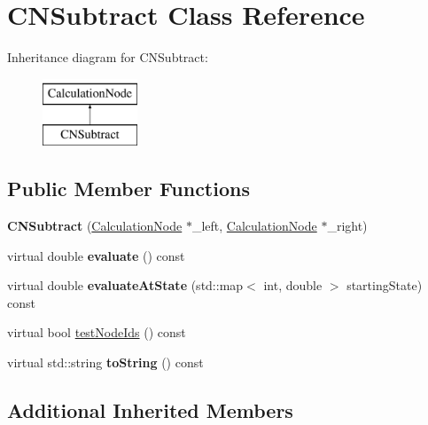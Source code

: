 \hypertarget{classCNSubtract}{}\section{C\+N\+Subtract Class Reference}
\label{classCNSubtract}
Inheritance diagram for C\+N\+Subtract\+:\begin{figure}[H]
\begin{center}
\leavevmode
\includegraphics[height=2.000000cm]{classCNSubtract}
\end{center}
\end{figure}
\subsection*{Public Member Functions}
\begin{DoxyCompactItemize}
\item 
{\bfseries C\+N\+Subtract} (\hyperlink{classCalculationNode}{Calculation\+Node} $\ast$\+\_\+left, \hyperlink{classCalculationNode}{Calculation\+Node} $\ast$\+\_\+right)\hypertarget{classCNSubtract_ab72c2b6679137655582d2001ac420dbf}{}\label{classCNSubtract_ab72c2b6679137655582d2001ac420dbf}

\item 
virtual double {\bfseries evaluate} () const \hypertarget{classCNSubtract_ae57879411a77bf2a5b16f28aa488a3d6}{}\label{classCNSubtract_ae57879411a77bf2a5b16f28aa488a3d6}

\item 
virtual double {\bfseries evaluate\+At\+State} (std\+::map$<$ int, double $>$ starting\+State) const \hypertarget{classCNSubtract_aa1d22fea2c4d0cdd26e64725d2be5205}{}\label{classCNSubtract_aa1d22fea2c4d0cdd26e64725d2be5205}

\item 
virtual bool \hyperlink{classCNSubtract_a83d03d12f8b0b209c78dda0d783453e1}{test\+Node\+Ids} () const 
\item 
virtual std\+::string {\bfseries to\+String} () const \hypertarget{classCNSubtract_a19ed00fcb52d52d40d97ed79a62e6dcd}{}\label{classCNSubtract_a19ed00fcb52d52d40d97ed79a62e6dcd}

\end{DoxyCompactItemize}
\subsection*{Additional Inherited Members}


